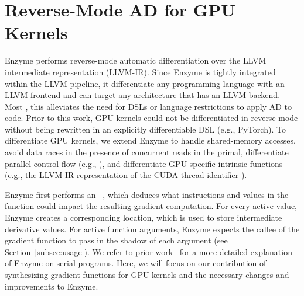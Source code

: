 \section{Reverse-Mode AD for GPU Kernels}
\label{sec:method}
Enzyme performs reverse-mode automatic differentiation over the LLVM intermediate representation (LLVM-IR).
Since Enzyme is tightly integrated within the LLVM pipeline, it  differentiate any programming language with an LLVM frontend and can target any architecture that has an LLVM backend.
Most , this alleviates the need for DSLs or language restrictions to apply AD to code.
Prior to this work, GPU kernels could not be differentiated in reverse mode without being rewritten in an explicitly differentiable DSL (e.g., PyTorch). To differentiate GPU kernels, we extend Enzyme to handle shared-memory accesses, avoid data races in the presence of concurrent reads in the primal, differentiate parallel control flow (e.g., ), and differentiate GPU-specific intrinsic functions (e.g., the LLVM-IR representation of the CUDA thread identifier ).

Enzyme first performs an ~\cite{bischof1992adifor}, which deduces what instructions and values in the function could impact the resulting gradient computation. For every active value, Enzyme creates a corresponding  location, which is used to store intermediate derivative values. For active function arguments, Enzyme expects the callee of the gradient function to pass in the shadow of each argument (see Section~\ref{subsec:usage}). We refer to prior work~\cite{enzymeNeurips} for a more detailed explanation of Enzyme on serial programs. Here, we will focus on our contribution of synthesizing gradient functions for GPU kernels and the necessary changes and improvements to Enzyme. 



